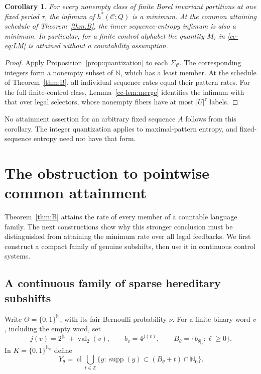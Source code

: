 \documentclass[11pt,reqno]{amsart}
\numberwithin{equation}{section}
\newtheorem{corollary}[theorem]{Corollary}
\theoremstyle{definition}
\newcommand{\N}{\mathbb N}
\newcommand{\Nzero}{\mathbb N_0}
\newcommand{\C}{\mathcal C}
\newcommand{\hpat}{h^{*}}
\newcommand{\supp}{\operatorname{supp}}
\begin{document}
\begin{corollary}\label{cor:pattern-minimum}
For every nonempty class of finite Borel invariant partitions at
one fixed period $\tau$, the infimum of $\hpat(\C;Q)$ is a minimum.
At the common attaining schedule of Theorem~\ref{thm:B}, the inner
sequence-entropy infimum is also a minimum. In particular, for a
finite control alphabet the quantity $M_\tau$ in
\eqref{cc-eq:LM} is attained without a countability assumption.
\end{corollary}
\begin{proof}
Apply Proposition~\ref{prop:quantization} to each $\Sigma_\C$.
The corresponding integers form a nonempty subset of $\N$, which
has a least member. At the schedule of Theorem~\ref{thm:B}, all
individual sequence rates equal their pattern rates.
For the full finite-control class, Lemma~\ref{cc-lem:merge}
identifies the infimum with that over legal selectors, whose
nonempty fibers have at most $|U|^\tau$ labels.
\end{proof}

No attainment assertion for an arbitrary fixed sequence $A$ follows
from this corollary. The integer quantization applies to maximal-pattern
entropy, and fixed-sequence entropy need not have that form.

\section{The obstruction to pointwise common attainment}
\label{app:pointwise}

Theorem~\ref{thm:B} attains the rate of every member of a countable
language family. The next constructions show why this stronger
conclusion must be distinguished from attaining the minimum rate
over all legal feedbacks. We first construct a compact family of
genuine subshifts, then use it in continuous control systems.

\subsection{A continuous family of sparse hereditary subshifts}

Write $\Theta=\{0,1\}^{\N}$, with its fair Bernoulli probability
$\nu$. For a finite binary word $v$, including the empty word, set
\[
 j(v)=2^{|v|}+\operatorname{val}_2(v),\qquad
 b_v=4^{j(v)},\qquad
 B_\theta=\{b_{\theta|_\ell}:\ell\ge0\}.
\]
In $K=\{0,1\}^{\Nzero}$ define
\[
 Y_\theta=
 \operatorname{cl}\bigcup_{t\in\mathbb Z}
 \{y:\supp(y)\subset(B_\theta+t)\cap\Nzero\}.
\]
\end{document}

